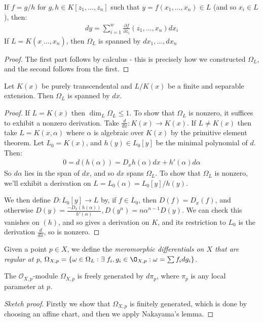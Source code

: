 \documentclass[10pt,a4paper,rgb]{article}
\begin{document}
\begin{lemma}
If $f = g/h$ for $g, h \in K[z_1, \ldots, z_n]$ such that $y = f(x_1, \ldots, x_n) \in L$ (and so $x_i \in L$), then:
\begin{align*}
dy = \sum_{i=1}^w \frac{\partial f}{\partial z_i}(z_1, \ldots, x_n) dx_i
\end{align*}
If $L = K(x_, \ldots, x_n)$, then $\Omega_L$ is spanned by $dx_1, \ldots, dx_n$
\end{lemma}
\begin{proof}
The first part follows by calculus - this is precisely how we constructed $\Omega_L$, and the second follows from the first.
\end{proof}
\begin{lemma}
Let $K(x)$ be purely transcendental and $L/K(x)$ be a finite and separable extension. Then $\Omega_L$ is spanned by $dx$.
\end{lemma}
\begin{proof}
If $L = K(x)$ then $\dim_L \Omega_L \leq 1$. To show that $\Omega_L$ is nonzero, it suffices to exhibit a nonzero derivation. Take $\frac{d}{dx}:K(x) \to K(x)$. If $L \neq K(x)$ then take $L = K(x, \alpha)$ where $\alpha$ is algebraic over $K(x)$ by the primitive element theorem. Let $L_0 = K(x)$, and $h(y) \in L_0[y]$ be the minimal polynomial of $d$. Then:
\begin{align*}
0 = d(h(\alpha)) = D_x h(\alpha)dx + h'(\alpha) d\alpha
\end{align*}
So $d\alpha$ lies in the span of $dx$, and so $dx$ spans $\Omega_L$. To show that $\Omega_L$ is nonzero, we'll exhibit a derivation on $L = L_0(\alpha) = L_0[y]/h(y)$.

We then define $D: L_0[y] \to L$ by, if $f \in L_0$, then $D(f) = D_x(f)$, and otherwise $D(y) = \frac{-D_x(h(\alpha))}{h'(\alpha)}, D(y^n) = n\alpha^{n-1}D(y)$. We can check this vanishes on $(h)$, and so gives a derivation on $K$, and its restriction to $L_0$ is the derivation $\frac{d}{dx}$, so is nonzero.
\end{proof}
Given a point $p \in X$, we define the \emph{meromorphic differentials on $X$ that are regular at p}, $\Omega_{X,p} = \{\omega \in \Omega_L : \exists f_i, g_i \in \O_{X,p}: \omega = \sum f_i dg_i\}$.
\begin{proposition}
The $\mathcal{O}_{X,p}$-module $\Omega_{X,p}$ is freely generated by $d\pi_p$, where $\pi_p$ is any local parameter at $p$.
\end{proposition}
\begin{proof}[Sketch proof]
Firstly we show that $\Omega_{X,p}$ is finitely generated, which is done by choosing an affine chart, and then we apply Nakayama's lemma.
\end{proof}
\end{document}

